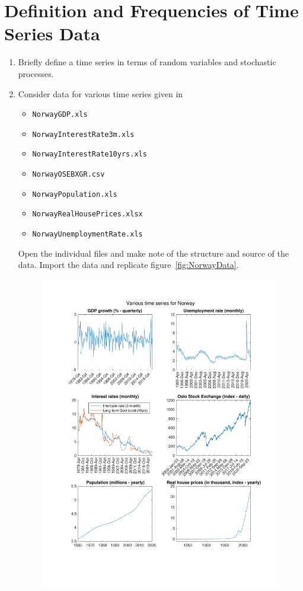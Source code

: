 \section[Definition and Frequencies of Time Series Data]{Definition and Frequencies of Time Series Data\label{ex:DefinitionFrequenciesTimeSeriesData}}

\begin{enumerate}
	\item Briefly define a time series in terms of random variables and stochastic processes.	
	\item Consider data for various time series given in
	\begin{itemize}
		\item \texttt{NorwayGDP.xls}
		\item \texttt{NorwayInterestRate3m.xls} 
		\item \texttt{NorwayInterestRate10yrs.xls}
		\item \texttt{NorwayOSEBXGR.csv}
		\item \texttt{NorwayPopulation.xls}
		\item \texttt{NorwayRealHousePrices.xlsx}
		\item \texttt{NorwayUnemploymentRate.xls}
	\end{itemize}
	Open the individual files and make note of the structure and source of the data.
	Import the data and replicate figure~\ref{fig:NorwayData}.
	   \begin{figure}[htbp]
		\centering
		\includegraphics[width=\linewidth]{plots/NorwayDataOverviewMatlab.pdf}

\end{figure}
\end{enumerate}
